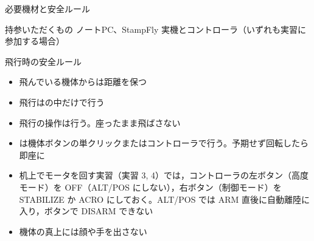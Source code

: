 \begin{frame}{必要機材と安全ルール}
  \begin{block}{持参いただくもの}
    \footnotesize ノートPC、StampFly 実機とコントローラ（いずれも実習に参加する場合）
  \end{block}

  \vspace{0.2em}

  \begin{alertblock}{飛行時の安全ルール}
    \begin{itemize}\footnotesize\setlength{\itemsep}{1pt}
      \item 飛んでいる機体からは距離を保つ
      \item 飛行はの中だけで行う
      \item 飛行の操作は行う。座ったまま飛ばさない
      \item {} は機体ボタンの単クリックまたはコントローラで行う。予期せず回転したら即座に 
      \item 机上でモータを回す実習（実習 3, 4）では，コントローラの左ボタン（高度モード）を OFF（ALT/POS にしない），右ボタン（制御モード）を STABILIZE か ACRO にしておく。ALT/POS では ARM 直後に自動離陸に入り，ボタンで DISARM できない
      \item 機体の真上には顔や手を出さない
    \end{itemize}
  \end{alertblock}
\end{frame}
